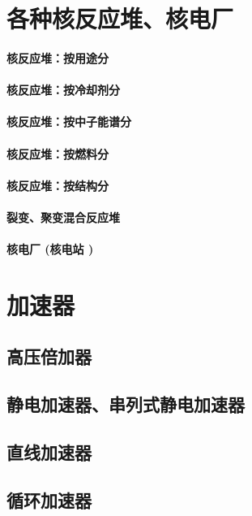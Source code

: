 \documentclass[UTF8]{../../ApplicationUniverse}
\begin{document}
\chapter{各种核反应堆、核电厂}
\subsubsection{核反应堆：按用途分}
\subsubsection{核反应堆：按冷却剂分}
\subsubsection{核反应堆：按中子能谱分}
\subsubsection{核反应堆：按燃料分}
\subsubsection{核反应堆：按结构分}
\subsubsection{裂变、聚变混合反应堆}
\subsubsection{核电厂 (核电站 )}







\chapter{加速器}
\section{高压倍加器}
\section{静电加速器、串列式静电加速器}
\section{直线加速器}
\section{循环加速器}
\end{document}

